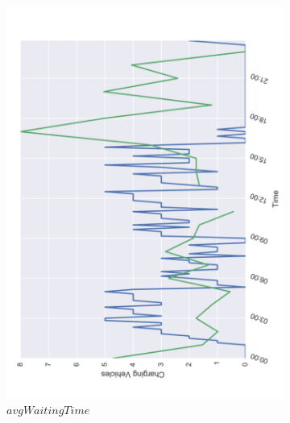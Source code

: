 \documentclass[12pt,a4paper]{article}
\begin{document}
\begin{figure}
{\begin{subfigure}[b]{0.45\textwidth}
  \includegraphics[width=\linewidth]{./images/charge1}
  \caption{$avgWaitingTime$}
  \label{wtcost}
\end{subfigure}
\begin{subfigure}[b]{0.458\textwidth}

\end{subfigure}}
\end{figure}
\end{document}
